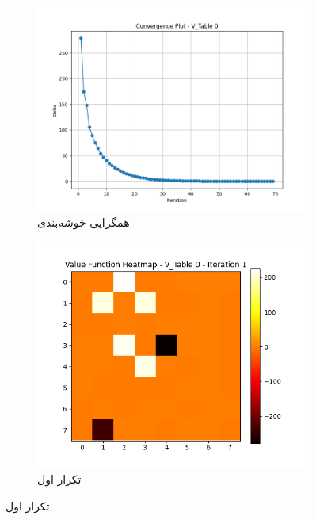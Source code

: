 \documentclass[11pt, a4paper, oneside]{report}
\begin{document}
	\begin{figure}[H]
		\begin{subfigure}{0.40\textwidth}
			\includegraphics[width=\textwidth]{./images/conv}
			\caption{همگرایی خوشه‌بندی}
			\label{fig:i}
		\end{subfigure}
		\hfill
		\begin{subfigure}{0.40\textwidth}
			\includegraphics[width=\textwidth]{./images/iter1}
			\caption{تکرار اول}
			\label{fig:j}
		\end{subfigure}
		

\end{figure}
\end{document}
